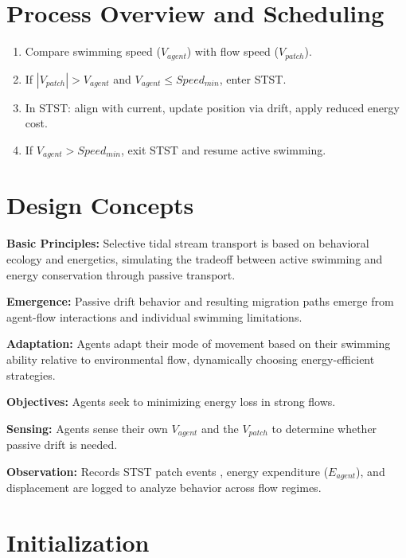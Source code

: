 \documentclass[
]{book}
\begin{document}
\section{Process Overview and Scheduling}\label{process-overview-and-scheduling-5}

\begin{enumerate}
\def\labelenumi{\arabic{enumi}.}
\item
  Compare swimming speed (\(V_{agent}\)) with flow speed (\(V_{patch}\)).
\item
  If \(|V_{patch}| > V_{agent}\) and \(V_{agent} \leq Speed_{min}\), enter STST.
\item
  In STST: align with current, update position via drift, apply reduced energy cost.
\item
  If \(V_{agent} > Speed_{min}\), exit STST and resume active swimming.
\end{enumerate}

\section{Design Concepts}\label{design-concepts-5}

\textbf{Basic Principles:} Selective tidal stream transport is based on behavioral ecology and energetics, simulating the tradeoff between active swimming and energy conservation through passive transport.

\textbf{Emergence:} Passive drift behavior and resulting migration paths emerge from agent-flow interactions and individual swimming limitations.

\textbf{Adaptation:} Agents adapt their mode of movement based on their swimming ability relative to environmental flow, dynamically choosing energy-efficient strategies.

\textbf{Objectives:} Agents seek to minimizing energy loss in strong flows.

\textbf{Sensing:} Agents sense their own \(V_{agent}\) and the \(V_{patch}\) to determine whether passive drift is needed.

\textbf{Observation:} Records STST patch events , energy expenditure (\(E_{agent}\)), and displacement are logged to analyze behavior across flow regimes.

\section{Initialization}\label{initialization-5}
\end{document}
